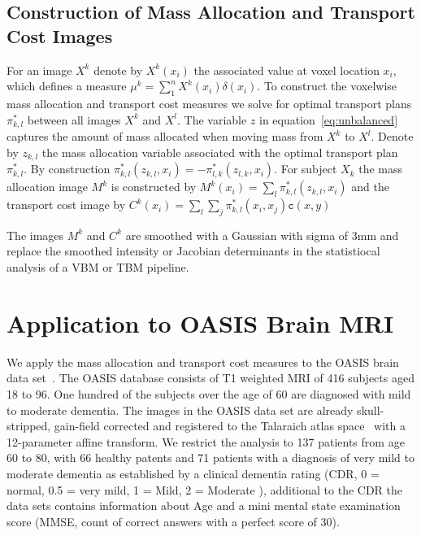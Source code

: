 \documentclass{llncs}
\newcommand{\cost}[0]{\mathtt{c}}
\newcommand{\coupling}[0]{\pi}
\begin{document}
\subsection{Construction of Mass Allocation and Transport Cost Images}
\label{sec:mass}
For an image $X^k$ denote by $X^k(x_i)$ the associated value at voxel location
$x_i$, which defines a measure $\mu^k = \sum_1^n X^k(x_i) \delta(x_i)$.
To construct the voxelwise mass allocation and transport cost measures we solve
for optimal transport plans $\coupling^*_{k,l}$ between all images $X^k$ and $X^l$.  
The variable $z$ in equation~\ref{eq:unbalanced} captures the amount of mass
allocated when moving mass from $X^k$ to $X^l$. Denote by $z_{k, l}$ the mass
allocation variable associated with the optimal transport plan
$\coupling^*_{k,l}$.  By construction $\coupling^*_{k,l}(z_{k,l}, x_i) =
-\coupling^*_{l,k}(z_{l,k}, x_i)$.  For
subject $X_k$ the mass allocation image $M^k$ is constructed by
$M^k(x_i) = \sum_l \coupling^*_{k,l}( z_{k, l}, x_i )$ and the transport cost image by
$C^k(x_i) = \sum_l \sum_j \coupling^*_{k,l}( x_i, x_j ) \cost(x, y)$


The images $M^k$ and $C^k$ are smoothed with a Gaussian with sigma of 3mm and
replace the smoothed intensity or Jacobian determinants in the statistiocal
analysis of a VBM or TBM pipeline. 


\section{Application to OASIS Brain MRI}
\label{sec:results}
We apply the mass allocation and transport cost measures to the OASIS brain
data set~\cite{marcus2010open}.  The OASIS database consists of T1 weighted
MRI of 416 subjects aged 18 to 96. One hundred of the subjects over the age of
60 are diagnosed with mild to moderate dementia. The images in the OASIS data
set are already skull-stripped, gain-field corrected and registered to the
Talaraich atlas space~\cite{talaraich:book88} with a 12-parameter affine
transform.  We restrict the analysis to 137 patients from age 60 to 80, with 66
healthy patents and 71 patients with a diagnosis of very mild to moderate
dementia as established by a clinical dementia rating (CDR, 0 = normal, 0.5 =
very mild, 1 = Mild, 2 = Moderate ), additional to the CDR the data sets
contains information about Age and a mini mental state examination score (MMSE,
count of correct answers with a perfect score of 30).
\end{document}

